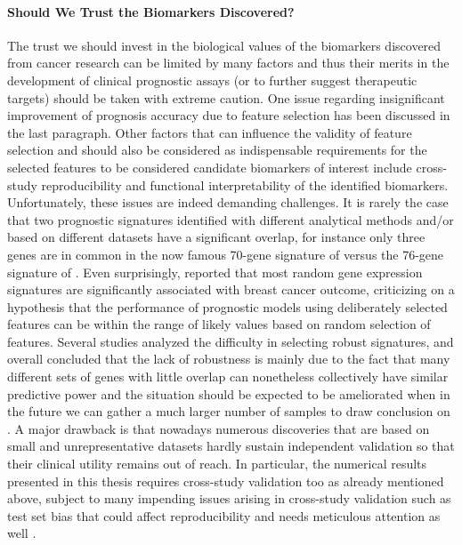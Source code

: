 \paragraph{Should We Trust the Biomarkers Discovered?} The trust we should invest in the biological values of the biomarkers discovered from cancer research can be limited by many factors and thus their merits in the development of clinical prognostic assays (or to further suggest therapeutic targets) should be taken with extreme caution. One issue regarding insignificant improvement of prognosis accuracy due to feature selection has been discussed in the last paragraph. Other factors that can influence the validity of feature selection and should also be considered as indispensable requirements for the selected features to be considered candidate biomarkers of interest include cross-study reproducibility and functional interpretability of the identified biomarkers. Unfortunately, these issues are indeed demanding challenges. It is rarely the case that two prognostic signatures identified with different analytical methods and/or based on different datasets have a significant overlap, for instance only three genes are in common in the now famous 70-gene signature of \cite{Veer2002Gene} versus the 76-gene signature of \cite{Wang2005Gene}. Even surprisingly, \cite{Venet2011Most} reported that most random gene expression signatures are significantly associated with breast cancer outcome, criticizing on a hypothesis that the performance of prognostic models using deliberately selected features can be within the range of likely values based on random selection of features. Several studies analyzed the difficulty in selecting robust signatures, and overall concluded that the lack of robustness is mainly due to the fact that many different sets of genes with little overlap can nonetheless collectively have similar predictive power and the situation should be expected to be ameliorated when in the future we can gather a much larger number of samples to draw conclusion on \cite{Michiels2005Prediction, Ein-Dor2006Thousands, Haury2011influence}. A major drawback is that nowadays numerous discoveries that are based on small and unrepresentative datasets hardly sustain independent validation so that their clinical utility remains out of reach. In particular, the numerical results presented in this thesis requires cross-study validation too as already mentioned above, subject to many impending issues arising in cross-study validation such as test set bias that could affect reproducibility and needs meticulous attention as well \cite{Patil2015Test}.


